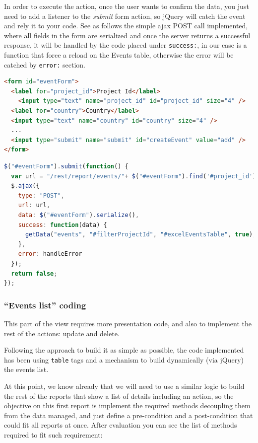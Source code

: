 In order to execute the action, once the user wants to confirm the data, you
just need to add a listener to the \emph{submit} form action, so jQuery will
catch the event and rely it to your code. See as follows the simple ajax POST
call implemented, where all fields in the form are serialized and once the
server returns a successful response, it will be handled by the code placed
under \texttt{success:}, in our case is a function that force a reload on the Events
table, otherwise the error will be catched by \texttt{error:} section.
\\

\begin{lstlisting}[language=HTML,breaklines=true,caption=Add\ new\ Event\
HTML\ code,label=f_migration_addnewevent_html]
<form id="eventForm">
  <label for="project_id">Project Id</label>
    <input type="text" name="project_id" id="project_id" size="4" />
  <label for="country">Country</label>
  <input type="text" name="country" id="country" size="4" /> 
  ...
  <input type="submit" name="submit" id="createEvent" value="add" />
</form>
\end{lstlisting}

\begin{lstlisting}[language=Javascript,breaklines=true,caption=Add\ new\ Event\
jQuery\ code,label=f_migration_addnewevent_jquery] 
$("#eventForm").submit(function() { 
  var url = "/rest/report/events/"+ $("#eventForm").find('#project_id').val();
  $.ajax({ 
    type: "POST", 
    url: url, 
    data: $("#eventForm").serialize(),
    success: function(data) {
      getData("events", "#filterProjectId", "#excelEventsTable", true);
    },
    error: handleError
  });
  return false;
});
\end{lstlisting}

\subsubsection{``Events list'' coding}
\label{sec:eventlist}

This part of the view requires more presentation code, and also to
implement the rest of the actions: update and delete.

Following the approach to build it as simple as possible, the code implemented
has been using \texttt{table} tags and a mechanism to build dynamically (via
jQuery) the events list. 

At this point, we know already that we will need to use a similar logic to build
the rest of the reports that show a list of details including an action, so the
objective on this first report is implement the required methods decoupling them
from the data managed, and just define a pre-condition and a post-condition that
could fit all reports at once. After evaluation you can see the list of methods
required to fit such requirement:

